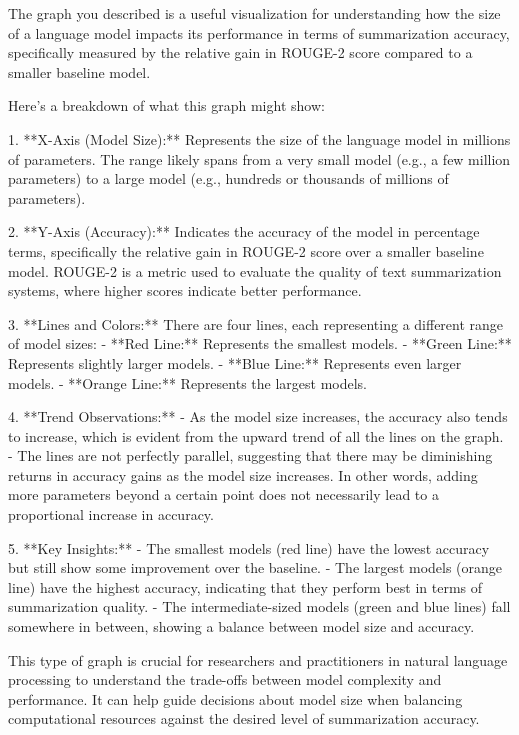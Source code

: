 The graph you described is a useful visualization for understanding how the size of a language model impacts its performance in terms of summarization accuracy, specifically measured by the relative gain in ROUGE-2 score compared to a smaller baseline model.

Here's a breakdown of what this graph might show:

1. **X-Axis (Model Size):** Represents the size of the language model in millions of parameters. The range likely spans from a very small model (e.g., a few million parameters) to a large model (e.g., hundreds or thousands of millions of parameters).

2. **Y-Axis (Accuracy):** Indicates the accuracy of the model in percentage terms, specifically the relative gain in ROUGE-2 score over a smaller baseline model. ROUGE-2 is a metric used to evaluate the quality of text summarization systems, where higher scores indicate better performance.

3. **Lines and Colors:** There are four lines, each representing a different range of model sizes:
   - **Red Line:** Represents the smallest models.
   - **Green Line:** Represents slightly larger models.
   - **Blue Line:** Represents even larger models.
   - **Orange Line:** Represents the largest models.

4. **Trend Observations:**
   - As the model size increases, the accuracy also tends to increase, which is evident from the upward trend of all the lines on the graph.
   - The lines are not perfectly parallel, suggesting that there may be diminishing returns in accuracy gains as the model size increases. In other words, adding more parameters beyond a certain point does not necessarily lead to a proportional increase in accuracy.

5. **Key Insights:**
   - The smallest models (red line) have the lowest accuracy but still show some improvement over the baseline.
   - The largest models (orange line) have the highest accuracy, indicating that they perform best in terms of summarization quality.
   - The intermediate-sized models (green and blue lines) fall somewhere in between, showing a balance between model size and accuracy.

This type of graph is crucial for researchers and practitioners in natural language processing to understand the trade-offs between model complexity and performance. It can help guide decisions about model size when balancing computational resources against the desired level of summarization accuracy.